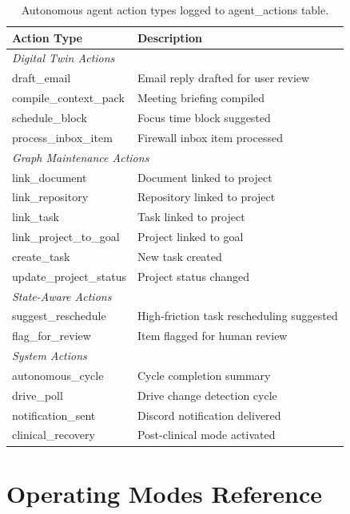 \documentclass[11pt,a4paper]{article}
\begin{document}
\begin{table}[h]
\centering
\caption{Autonomous agent action types logged to agent\_actions table.}
\begin{tabular}{ll}
\toprule
\textbf{Action Type} & \textbf{Description} \\
\midrule
\multicolumn{2}{l}{\textit{Digital Twin Actions}} \\
draft\_email & Email reply drafted for user review \\
compile\_context\_pack & Meeting briefing compiled \\
schedule\_block & Focus time block suggested \\
process\_inbox\_item & Firewall inbox item processed \\
\midrule
\multicolumn{2}{l}{\textit{Graph Maintenance Actions}} \\
link\_document & Document linked to project \\
link\_repository & Repository linked to project \\
link\_task & Task linked to project \\
link\_project\_to\_goal & Project linked to goal \\
create\_task & New task created \\
update\_project\_status & Project status changed \\
\midrule
\multicolumn{2}{l}{\textit{State-Aware Actions}} \\
suggest\_reschedule & High-friction task rescheduling suggested \\
flag\_for\_review & Item flagged for human review \\
\midrule
\multicolumn{2}{l}{\textit{System Actions}} \\
autonomous\_cycle & Cycle completion summary \\
drive\_poll & Drive change detection cycle \\
notification\_sent & Discord notification delivered \\
clinical\_recovery & Post-clinical mode activated \\
\bottomrule
\end{tabular}
\end{table}

\section{Operating Modes Reference}
\label{app:modes}
\end{document}
